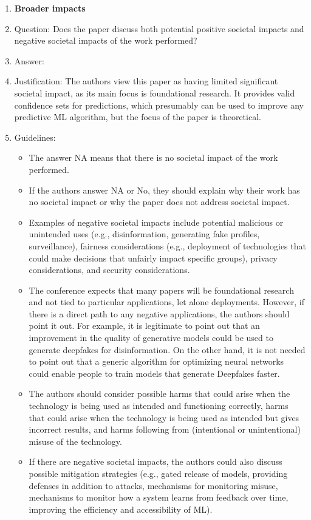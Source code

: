 \documentclass{article}
\begin{document}
\begin{enumerate}
\item {\bf Broader impacts}
    \item[] Question: Does the paper discuss both potential positive societal impacts and negative societal impacts of the work performed?
    \item[] Answer: \answerNA{} %
    \item[] Justification: The authors view this paper as having
      limited significant societal impact, as its main focus is
      foundational research. It provides valid confidence sets for
      predictions, which presumably can be used to improve any
      predictive ML algorithm, but the focus of the paper is theoretical.
    \item[] Guidelines:
    \begin{itemize}
        \item The answer NA means that there is no societal impact of the work performed.
        \item If the authors answer NA or No, they should explain why their work has no societal impact or why the paper does not address societal impact.
        \item Examples of negative societal impacts include potential malicious or unintended uses (e.g., disinformation, generating fake profiles, surveillance), fairness considerations (e.g., deployment of technologies that could make decisions that unfairly impact specific groups), privacy considerations, and security considerations.
        \item The conference expects that many papers will be foundational research and not tied to particular applications, let alone deployments. However, if there is a direct path to any negative applications, the authors should point it out. For example, it is legitimate to point out that an improvement in the quality of generative models could be used to generate deepfakes for disinformation. On the other hand, it is not needed to point out that a generic algorithm for optimizing neural networks could enable people to train models that generate Deepfakes faster.
        \item The authors should consider possible harms that could arise when the technology is being used as intended and functioning correctly, harms that could arise when the technology is being used as intended but gives incorrect results, and harms following from (intentional or unintentional) misuse of the technology.
        \item If there are negative societal impacts, the authors could also discuss possible mitigation strategies (e.g., gated release of models, providing defenses in addition to attacks, mechanisms for monitoring misuse, mechanisms to monitor how a system learns from feedback over time, improving the efficiency and accessibility of ML).
    \end{itemize}
    

\end{enumerate}
\end{document}

